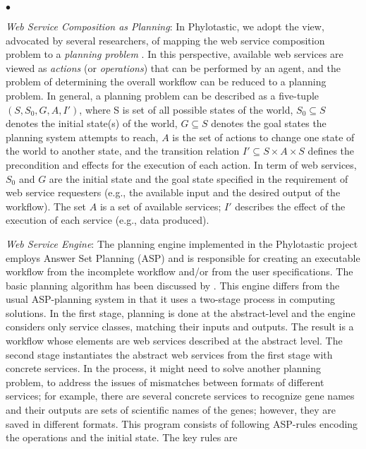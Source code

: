 \documentclass{new_tlp}
\begin{document}
\begin{list}{$\bullet$}{\itemsep=0pt \topsep=1pt \parsep=0pt \leftmargin=10pt}
\item \emph{Web Service Composition as Planning}:  
In Phylotastic, we adopt the  view, advocated by several researchers, of mapping the web service
composition problem to a \emph{planning problem} \cite{compose4,mcisonzen01,compose7}. In this perspective, available web services
are viewed as \emph{actions} (or \emph{operations}) that can be performed by an agent, and the problem of determining the overall workflow can be reduced to a planning problem.
 In general, a planning problem can be described as a five-tuple $(S, S_0, G, A , I')$, where S is set of all possible states of the world, $S_0 \subseteq S$ denotes the initial state(s) of the world, $G \subseteq S$ denotes the goal states  the planning system attempts to reach, $A$ is the set of actions   to change one state of the world to another state, and the transition relation $I' \subseteq S \times A \times S$ defines the precondition and effects for the execution of each action. In term of web services, $S_0$ and $G$ are the initial state and the goal state specified in the requirement of web service requesters (e.g., the available input and the desired output of the workflow). The set  $A$ is a set of available services; $I'$  describes the effect of the execution of each service (e.g., data produced).
 
\item \emph{Web Service Engine}: The planning engine implemented in the Phylotastic project employs  
Answer Set Planning (ASP) \cite{Lifschitz02} and is responsible
for creating an executable workflow from the incomplete workflow and/or from the user specifications. The basic
planning algorithm has been discussed by . This engine differs from the usual ASP-planning system 
in that it uses a two-stage process in computing solutions. In the first stage, planning is done at the 
abstract-level and the engine considers only service classes, matching their inputs and outputs. The result is 
a workflow whose elements are web services described at the abstract level. The second stage instantiates 
the abstract web services from the first stage with concrete services. In the process, it might need
to solve another planning problem, to address the issues of mismatches between formats of different 
services; for example,  there are several concrete services to recognize gene names and their outputs are sets
of scientific names of the genes; however, they are saved in different formats. 
This program consists of following ASP-rules encoding the operations and the initial state. 
The key rules are 


\end{list}
\end{document}
